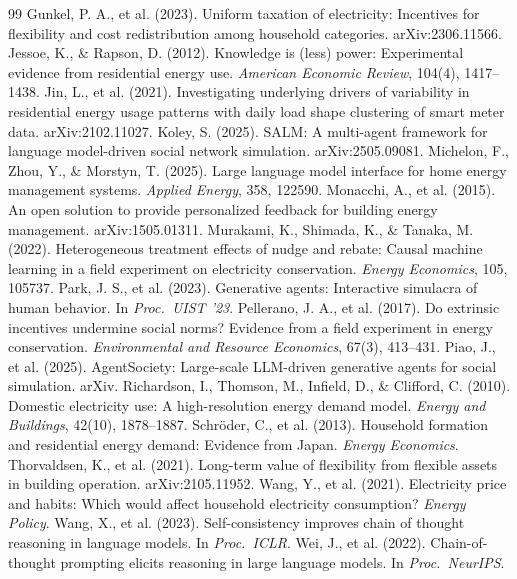 \documentclass[11pt]{article}
\begin{document}
\begin{thebibliography}{99}
 Gunkel, P. A., et al. (2023). Uniform taxation of electricity: Incentives for flexibility and cost redistribution among household categories. arXiv:2306.11566.
 Jessoe, K., \& Rapson, D. (2012). Knowledge is (less) power: Experimental evidence from residential energy use. \emph{American Economic Review}, 104(4), 1417--1438.
 Jin, L., et al. (2021). Investigating underlying drivers of variability in residential energy usage patterns with daily load shape clustering of smart meter data. arXiv:2102.11027.
 Koley, S. (2025). SALM: A multi-agent framework for language model-driven social network simulation. arXiv:2505.09081.
 Michelon, F., Zhou, Y., \& Morstyn, T. (2025). Large language model interface for home energy management systems. \emph{Applied Energy}, 358, 122590.
 Monacchi, A., et al. (2015). An open solution to provide personalized feedback for building energy management. arXiv:1505.01311.
 Murakami, K., Shimada, K., \& Tanaka, M. (2022). Heterogeneous treatment effects of nudge and rebate: Causal machine learning in a field experiment on electricity conservation. \emph{Energy Economics}, 105, 105737.
 Park, J. S., et al. (2023). Generative agents: Interactive simulacra of human behavior. In \emph{Proc.\ UIST '23}.
 Pellerano, J. A., et al. (2017). Do extrinsic incentives undermine social norms? Evidence from a field experiment in energy conservation. \emph{Environmental and Resource Economics}, 67(3), 413--431.
 Piao, J., et al. (2025). AgentSociety: Large-scale LLM-driven generative agents for social simulation. arXiv.
 Richardson, I., Thomson, M., Infield, D., \& Clifford, C. (2010). Domestic electricity use: A high-resolution energy demand model. \emph{Energy and Buildings}, 42(10), 1878--1887.
 Schr\"oder, C., et al. (2013). Household formation and residential energy demand: Evidence from Japan. \emph{Energy Economics}.
 Thorvaldsen, K., et al. (2021). Long-term value of flexibility from flexible assets in building operation. arXiv:2105.11952.
 Wang, Y., et al. (2021). Electricity price and habits: Which would affect household electricity consumption? \emph{Energy Policy}.
 Wang, X., et al. (2023). Self-consistency improves chain of thought reasoning in language models. In \emph{Proc.\ ICLR}.
 Wei, J., et al. (2022). Chain-of-thought prompting elicits reasoning in large language models. In \emph{Proc.\ NeurIPS}.

\end{thebibliography}
\end{document}
